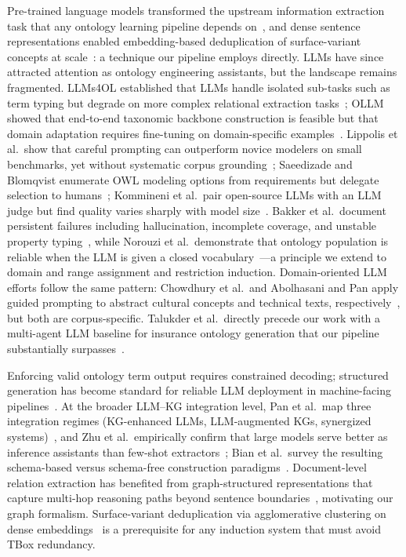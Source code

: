 \documentclass[sigconf]{acmart}
\begin{document}
Pre-trained language models transformed the upstream information extraction task that any ontology learning pipeline depends on~\cite{devlin2019bert}, and dense sentence representations enabled embedding-based deduplication of surface-variant concepts at scale~\cite{reimers2019sentence}: a technique our pipeline employs directly. LLMs have since attracted attention as ontology engineering assistants, but the landscape remains fragmented. LLMs4OL established that LLMs handle isolated sub-tasks such as term typing but degrade on more complex relational extraction tasks~\cite{babaei2023llms4ol}; OLLM showed that end-to-end taxonomic backbone construction is feasible but that domain adaptation requires fine-tuning on domain-specific examples~\cite{lo2024end}. Lippolis et al.\ show that careful prompting can outperform novice modelers on small benchmarks, yet without systematic corpus grounding~\cite{lippolis2025ontology}; Saeedizade and Blomqvist enumerate OWL modeling options from requirements but delegate selection to humans~\cite{saeedizade2024navigating}; Kommineni et al.\ pair open-source LLMs with an LLM judge but find quality varies sharply with model size~\cite{kommineni2024human}. Bakker et al.\ document persistent failures including hallucination, incomplete coverage, and unstable property typing~\cite{bakker2024ontology}, while Norouzi et al.\ demonstrate that ontology population is reliable when the LLM is given a closed vocabulary~\cite{norouzi2025ontology}---a principle we extend to domain and range assignment and restriction induction. Domain-oriented LLM efforts follow the same pattern: Chowdhury et al.\ and Abolhasani and Pan apply guided prompting to abstract cultural concepts and technical texts, respectively~\cite{chowdhury2025automated,abolhasani2024leveraging}, but both are corpus-specific. Talukder et al.\ directly precede our work with a multi-agent LLM baseline for insurance ontology generation that our pipeline substantially surpasses~\cite{talukder2026towards}.

Enforcing valid ontology term output requires constrained decoding; structured generation has become standard for reliable LLM deployment in machine-facing pipelines~\cite{willard2023efficient, beurer2024guiding, geng2025generating}.
At the broader LLM--KG integration level, Pan et al.\ map three integration regimes (KG-enhanced LLMs, LLM-augmented KGs, synergized systems)~\cite{pan2024unifying}, and Zhu et al.\ empirically confirm that large models serve better as inference assistants than few-shot extractors~\cite{zhu2024llms}; Bian et al.\ survey the resulting schema-based versus schema-free construction paradigms~\cite{bian2025llm}. Document-level relation extraction has benefited from graph-structured representations that capture multi-hop reasoning paths beyond sentence boundaries~\cite{yao2019docred}, motivating our graph formalism. Surface-variant deduplication via agglomerative clustering on dense embeddings~\cite{mullner2011modern} is a prerequisite for any induction system that must avoid TBox redundancy.
\end{document}
